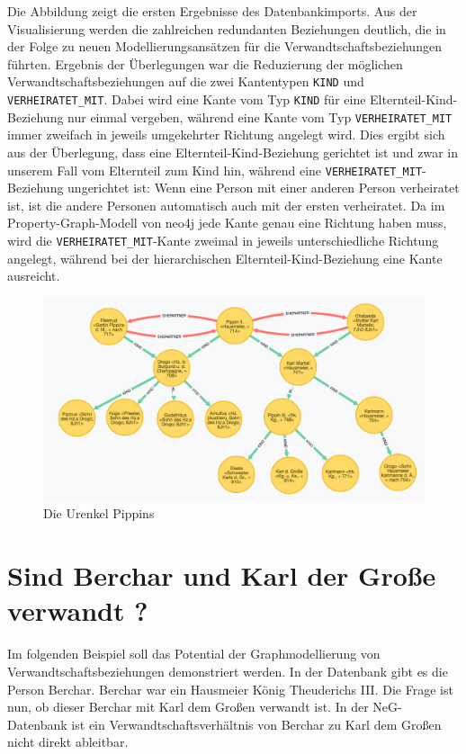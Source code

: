 \documentclass[ngerman,]{scrreprt}
\begin{document}
Die Abbildung zeigt die ersten Ergebnisse des Datenbankimports. Aus der Visualisierung werden die zahlreichen redundanten Beziehungen deutlich, die in der Folge zu neuen Modellierungsansätzen für die Verwandtschaftsbeziehungen führten. Ergebnis der Überlegungen war die Reduzierung der möglichen Verwandtschaftsbeziehungen auf die zwei Kantentypen \texttt{KIND} und \texttt{VERHEIRATET\_MIT}. Dabei wird eine Kante vom Typ \texttt{KIND} für eine Elternteil-Kind-Beziehung nur einmal vergeben, während eine Kante vom Typ \texttt{VERHEIRATET\_MIT} immer zweifach in jeweils umgekehrter Richtung angelegt wird. Dies ergibt sich aus der Überlegung, dass eine Elternteil-Kind-Beziehung gerichtet ist und zwar in unserem Fall vom Elternteil zum Kind hin, während eine \texttt{VERHEIRATET\_MIT}-Beziehung ungerichtet ist: Wenn eine Person mit einer anderen Person verheiratet ist, ist die andere Personen automatisch auch mit der ersten verheiratet. Da im Property-Graph-Modell von neo4j jede Kante genau eine Richtung haben muss, wird die \texttt{VERHEIRATET\_MIT}-Kante zweimal in jeweils unterschiedliche Richtung angelegt, während bei der hierarchischen Elternteil-Kind-Beziehung eine Kante ausreicht.

\begin{figure}
\centering
\includegraphics{Bilder/NeG/030-Urenkel-Pippins.jpg}
\caption{Die Urenkel Pippins}
\end{figure}

\hypertarget{sind-berchar-und-karl-der-grouxdfe-verwandt}{%
\section{Sind Berchar und Karl der Große verwandt ?}\label{sind-berchar-und-karl-der-grouxdfe-verwandt}}

Im folgenden Beispiel soll das Potential der Graphmodellierung von Verwandtschaftsbeziehungen demonstriert werden. In der Datenbank gibt es die Person Berchar. Berchar war ein Hausmeier König Theuderichs III. Die Frage ist nun, ob dieser Berchar mit Karl dem Großen verwandt ist. In der NeG-Datenbank ist ein Verwandtschaftsverhältnis von Berchar zu Karl dem Großen nicht direkt ableitbar.
\end{document}
